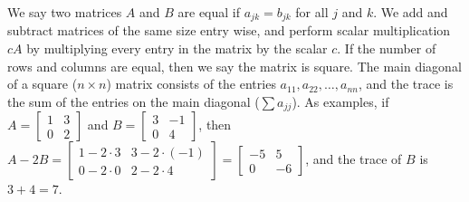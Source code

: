 \documentclass[10pt]{article}
\begin{document}
We say two matrices {$A$} and {$B$} are equal if {$a_{jk}=b_{jk}$} for all $j$ and $k$. We add and subtract matrices of the same size entry wise, and perform scalar multiplication $cA$ by multiplying every entry in the matrix by the scalar {$c$}. If the number of rows and columns are equal, then we say the matrix is square.  The main diagonal of a square ({$n \times n$}) matrix consists of the entries {$a_{11},a_{22},\ldots,a_{nn}$}, and the trace is the sum of the entries on the main diagonal ($\sum a_{jj}$). As examples, if $A=\begin{bmatrix}
1&3\\
0&2
\end{bmatrix}
$ and 
$B=
\begin{bmatrix}
3&-1\\
0&4
\end{bmatrix}
$, then $A-2B
=\begin{bmatrix}
1-2\cdot3&3-2\cdot(-1)\\
0-2\cdot 0& 2-2\cdot 4
\end{bmatrix}
=\begin{bmatrix}
-5&5\\
0&-6
\end{bmatrix}$, and the trace of $B$ is $3+4=7$.
\end{document}
